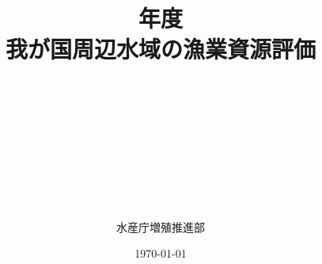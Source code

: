 \documentclass[A4j, disablejfam, titlepage, openright, twoside, 10.5pt, dvipdfmx, report, uplatex]{myjsbook}
\begin{document}
\frontmatter
%
%
\title{
{\thisyrjp}年度
\\
{\HUGE 我が国周辺水域の漁業資源評価}}
\author{\\
\\
\\
\\
\\
\\
\\
\\
\\
{\Large 水産庁増殖推進部}
\\
}
\date{\today}
%
%
%
\mainmatter
\tableofcontents
%
%
%
%
%
%
%


%


%
%
%
%
%
\end{document}
